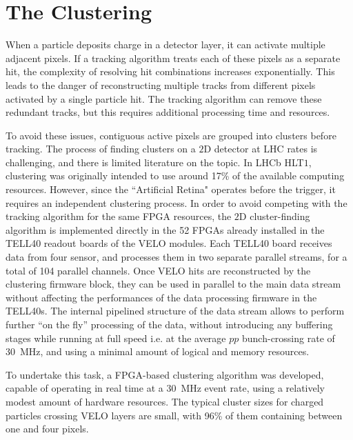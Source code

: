\section{The Clustering}



When a particle deposits charge in a detector layer, it can activate multiple adjacent pixels. If a tracking algorithm treats each of these pixels as a separate hit, the complexity of resolving hit combinations increases exponentially. This leads to the danger of reconstructing multiple tracks from different pixels activated by a single particle hit. The tracking algorithm can remove these redundant tracks, but this requires additional processing time and resources.

To avoid these issues, contiguous active pixels are grouped into clusters before tracking. The process of finding clusters on a $2$D detector at LHC rates is challenging, and there is limited literature on the topic. In LHCb HLT$1$, clustering was originally intended to use around 17\% of the available computing resources. However, since the ``Artificial Retina" operates before the trigger, it requires an independent clustering process. In order to avoid competing with the tracking algorithm for the same FPGA resources, the $2$D cluster-finding algorithm is implemented directly in the 52 FPGAs already installed in the TELL40 readout boards of the VELO modules. Each TELL40 board receives data from four sensor, and processes them in two separate parallel streams, for a total of 104 parallel channels. Once VELO hits are reconstructed by the clustering firmware block, they can be used in parallel to the main data stream without affecting the performances of the data processing firmware in the TELL40s. The internal pipelined structure of the data stream allows to perform further ``on the fly''  processing of the data, without introducing any buffering stages while running at full speed i.e. at the average $pp$ bunch-crossing rate of \SI{30}{\mega\hertz}, and using a minimal amount of logical and memory resources.%

To undertake this task, a FPGA-based clustering algorithm was developed, capable of operating in real time at a \SI{30}{\mega\hertz} event rate, using a relatively modest amount of hardware resources. The typical cluster sizes for charged particles crossing VELO layers are small, with 96\% of them containing between one and four pixels. 

